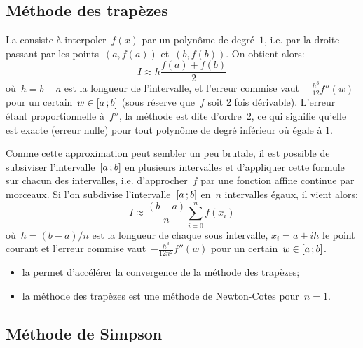 \medskip
\subsection*{Méthode des trapèzes} 

La  consiste à interpoler~$f(x)$ par un polynôme de degré~$1$, i.e. par la droite passant par les points~$(a,f(a))$ et~$(b,f(b))$. On obtient alors: 
\begin{equation}
 I\approx h\dfrac{f(a)+f(b)}2
\end{equation}
où~$h=b-a$ est la longueur de l'intervalle, et l'erreur commise vaut~$-\frac{h^3}{12} f''(w)$ pour un certain~$w\in\mathopen{[}a\,;b\mathclose{]}$ (sous réserve que~$f$ soit 2 fois dérivable). L'erreur étant proportionnelle à~$f''$, la méthode est dite d'ordre~$2$, ce qui signifie qu'elle est exacte (erreur nulle) pour tout polynôme de degré inférieur où égale à 1. 

Comme cette approximation peut sembler un peu brutale, il est possible de subsiviser l'intervalle~$\mathopen{[}a\,;b\mathclose{]}$ en plusieurs intervalles et d'appliquer cette formule sur chacun des intervalles, i.e. d'approcher~$f$ par une fonction affine continue par morceaux. Si l'on subdivise l'intervalle~$\mathopen{[}a\,;b\mathclose{]}$ en~$n$ intervalles égaux, il vient alors: 
\begin{equation}
I\approx \frac{(b-a)}{n}\sum_{i=0}^{n}f(x_i)
\end{equation}
où~$h=(b-a)/n$ est la longueur de chaque sous intervalle, $x_i=a+ih$ le point courant et l'erreur commise vaut~$-\frac{h^3}{12n^2} f''(w)$ pour un certain~$w\in\mathopen{[}a\,;b\mathclose{]}$. 
\medskipvm
\begin{remarque}[Remarques]\mbox{}
\begin{itemize}
\item la  permet d'accélérer la convergence de la méthode des trapèzes;
\item la méthode des trapèzes est une méthode de Newton-Cotes pour~$n=1$. 
\end{itemize}
\end{remarque} 

\medskip
\subsection*{Méthode de Simpson} 

